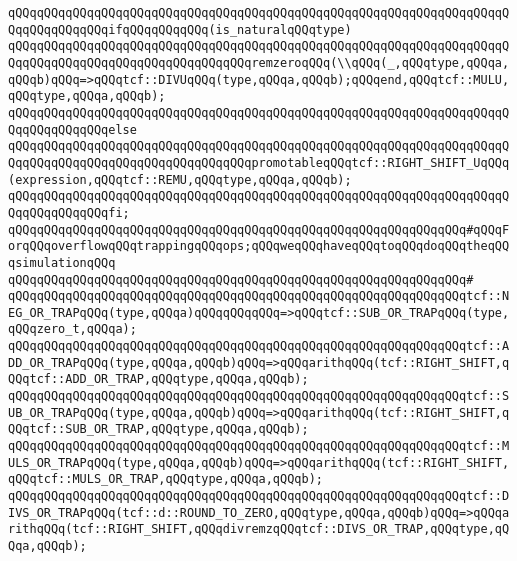 \verb|qQQqqQQqqQQqqQQqqQQqqQQqqQQqqQQqqQQqqQQqqQQqqQQqqQQqqQQqqQQqqQQqqQQqqQQqqQQqqQQqqQQqifqQQqqQQqqQQq(is_naturalqQQqtype)|\newline
\newline
\verb|qQQqqQQqqQQqqQQqqQQqqQQqqQQqqQQqqQQqqQQqqQQqqQQqqQQqqQQqqQQqqQQqqQQqqQQqqQQqqQQqqQQqqQQqqQQqqQQqqQQqqQQqremzeroqQQq(\\qQQq(_,qQQqtype,qQQqa,qQQqb)qQQq=>qQQqtcf::DIVUqQQq(type,qQQqa,qQQqb);qQQqend,qQQqtcf::MULU,qQQqtype,qQQqa,qQQqb);|\newline
\verb|qQQqqQQqqQQqqQQqqQQqqQQqqQQqqQQqqQQqqQQqqQQqqQQqqQQqqQQqqQQqqQQqqQQqqQQqqQQqqQQqqQQqelse|\newline
\verb|qQQqqQQqqQQqqQQqqQQqqQQqqQQqqQQqqQQqqQQqqQQqqQQqqQQqqQQqqQQqqQQqqQQqqQQqqQQqqQQqqQQqqQQqqQQqqQQqqQQqqQQqpromotableqQQqtcf::RIGHT_SHIFT_UqQQq(expression,qQQqtcf::REMU,qQQqtype,qQQqa,qQQqb);|\newline
\verb|qQQqqQQqqQQqqQQqqQQqqQQqqQQqqQQqqQQqqQQqqQQqqQQqqQQqqQQqqQQqqQQqqQQqqQQqqQQqqQQqqQQqfi;|\newline
\newline
\verb|qQQqqQQqqQQqqQQqqQQqqQQqqQQqqQQqqQQqqQQqqQQqqQQqqQQqqQQqqQQqqQQq#qQQqForqQQqoverflowqQQqtrappingqQQqops;qQQqweqQQqhaveqQQqtoqQQqdoqQQqtheqQQqsimulationqQQq|\newline
\verb|qQQqqQQqqQQqqQQqqQQqqQQqqQQqqQQqqQQqqQQqqQQqqQQqqQQqqQQqqQQqqQQq#|\newline
\verb|qQQqqQQqqQQqqQQqqQQqqQQqqQQqqQQqqQQqqQQqqQQqqQQqqQQqqQQqqQQqqQQqtcf::NEG_OR_TRAPqQQq(type,qQQqa)qQQqqQQqqQQq=>qQQqtcf::SUB_OR_TRAPqQQq(type,qQQqzero_t,qQQqa);|\newline
\verb|qQQqqQQqqQQqqQQqqQQqqQQqqQQqqQQqqQQqqQQqqQQqqQQqqQQqqQQqqQQqqQQqtcf::ADD_OR_TRAPqQQq(type,qQQqa,qQQqb)qQQq=>qQQqarithqQQq(tcf::RIGHT_SHIFT,qQQqtcf::ADD_OR_TRAP,qQQqtype,qQQqa,qQQqb);|\newline
\verb|qQQqqQQqqQQqqQQqqQQqqQQqqQQqqQQqqQQqqQQqqQQqqQQqqQQqqQQqqQQqqQQqtcf::SUB_OR_TRAPqQQq(type,qQQqa,qQQqb)qQQq=>qQQqarithqQQq(tcf::RIGHT_SHIFT,qQQqtcf::SUB_OR_TRAP,qQQqtype,qQQqa,qQQqb);|\newline
\verb|qQQqqQQqqQQqqQQqqQQqqQQqqQQqqQQqqQQqqQQqqQQqqQQqqQQqqQQqqQQqqQQqtcf::MULS_OR_TRAPqQQq(type,qQQqa,qQQqb)qQQq=>qQQqarithqQQq(tcf::RIGHT_SHIFT,qQQqtcf::MULS_OR_TRAP,qQQqtype,qQQqa,qQQqb);|\newline
\verb|qQQqqQQqqQQqqQQqqQQqqQQqqQQqqQQqqQQqqQQqqQQqqQQqqQQqqQQqqQQqqQQqtcf::DIVS_OR_TRAPqQQq(tcf::d::ROUND_TO_ZERO,qQQqtype,qQQqa,qQQqb)qQQq=>qQQqarithqQQq(tcf::RIGHT_SHIFT,qQQqdivremzqQQqtcf::DIVS_OR_TRAP,qQQqtype,qQQqa,qQQqb);|\newline
